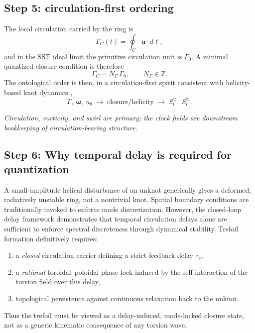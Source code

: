 \documentclass[11pt,a4paper]{article}
\begin{document}
    \subsection{Step 5: circulation-first ordering}
        The local circulation carried by the ring is
        \begin{equation}
            \Gamma_C(t)=\oint_C \mathbf{u}\cdot d\boldsymbol{\ell},
            \label{eq:loopcirculationTrefoil}
        \end{equation}
        and in the SST ideal limit the primitive circulation unit is \(\Gamma_0\). A minimal quantized closure condition is therefore
        \begin{equation}
            \Gamma_C = N_\Gamma\,\Gamma_0,
            \qquad
            N_\Gamma\in\mathbb Z.
            \label{eq:circulationquantizationTrefoil}
        \end{equation}
        The ontological order is then, in a circulation-first spirit consistent with helicity-based knot dynamics \cite{Moffatt1969},
        \begin{equation}
            \Gamma,\ \boldsymbol{\omega},\ u_\theta
            \;\longrightarrow\;
            \text{closure/helicity}
            \;\longrightarrow\;
            S_t^{\boldsymbol{\circlearrowleft}},\ S_t^{\boldsymbol{\circlearrowright}}.
            \label{eq:circulationbeforeclockTrefoil}
        \end{equation}
        
        \medskip\noindent\textit{Circulation, vorticity, and swirl are primary; the clock fields are downstream bookkeeping of circulation-bearing structure.}
    
    \subsection{Step 6: Why temporal delay is required for quantization}
        A small-amplitude helical disturbance of an unknot generically gives a deformed, radiatively unstable ring, not a nontrivial knot. Spatial boundary conditions are traditionally invoked to enforce mode discretization. However, the closed-loop delay framework demonstrates that temporal circulation delays alone are sufficient to enforce spectral discreteness through dynamical stability. Trefoil formation definitively requires:
        \begin{enumerate}
            \item a \emph{closed} circulation carrier defining a strict feedback delay $\tau_c$,
            \item a \emph{rational} toroidal--poloidal phase lock induced by the self-interaction of the torsion field over this delay,
            \item topological persistence against continuous relaxation back to the unknot.
        \end{enumerate}
        Thus the trefoil must be viewed as a delay-induced, mode-locked closure state, not as a generic kinematic consequence of any torsion wave.
        
\end{document}
